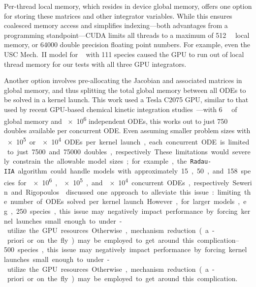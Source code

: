 \documentclass[preprint]{elsarticle}
\begin{document}
Per-thread local memory, which resides in device global memory, offers one option for storing these matrices and other integrator variables.
While this ensures coalesced memory access and simplifies indexing---both advantages from a programming standpoint---CUDA limits all threads to a maximum of \SI{512}{\kilo\byte} local memory, or \num{64000} double precision floating point numbers.
For example, even the USC Mech.~II model for ~\cite{Wang:2007} with 111 species caused the GPU to run out of local thread memory for our tests with all three GPU integrators.

Another option involves pre-allocating the Jacobian and associated matrices in global memory, and thus splitting the total global memory between all ODEs to be solved in a kernel launch.
This work used a Tesla C2075 GPU, similar to that used by recent GPU-based chemical kinetic integration studies~\cite{Shi:2011aa,Niemeyer:2011aa,Shi:2012aa,Le2013596,Stone:2013aa,Niemeyer:2014aa}---with \SI{6}{\giga\byte} of global memory and \num{e6} independent ODEs, this works out to just 750 doubles available per concurrent ODE.
Even assuming smaller problem sizes with \SI{e5} or \SI{e4} ODEs per kernel launch, each concurrent ODE is limited to just \num{7500} and \num{75000} doubles, respectively.
These limitations would severely constrain the allowable model sizes; for example, the \texttt{Radau-IIA} algorithm could handle models with approximately 15, 50, and 158 species for \num{e6}, \num{e5}, and \num{e4} concurrent ODEs, respectively.
Sewerin and Rigopoulos~\cite{Sewerin20151375} discussed one approach to alleviate this issue: limiting the number of ODEs solved per kernel launch.
However, for larger models, e.g., \SIrange{250}{500} species, this issue may negatively impact performance by forcing kernel launches small enough to under-utilize the GPU resources.
Otherwise, mechanism reduction (a-priori or on the fly) may be employed to get around this complication.
\end{document}
